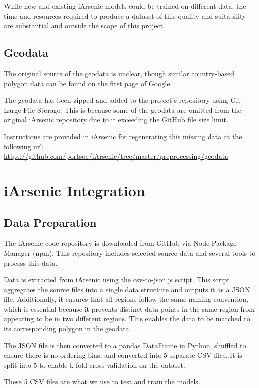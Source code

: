 While new and existing iArsenic models could be trained on different data, the time and resources required to produce a dataset of this quality and suitability are substantial and outside the scope of this project. 

\subsection{Geodata}

The original source of the geodata is unclear, though similar country-based polygon data can be found on the first page of Google.

The geodata has been zipped and added to the project's repository using Git Large File Storage. This is because some of the geodata are omitted from the original iArsenic repository due to it exceeding the GitHub file size limit. 

Instructions are provided in iArsenic for regenerating this missing data at the following url: \url{https://github.com/portsoc/iArsenic/tree/master/preprocessing/geodata}

\section{iArsenic Integration}

\subsection{Data Preparation}
\label{sub: data_prep}

The iArsenic code repository is downloaded from GitHub via Node Package Manager (npm). This repository includes selected source data and several tools to process this data.

Data is extracted from iArsenic using the csv-to-json.js script. This script aggregates the source files into a single data structure and outputs it as a JSON file. Additionally, it ensures that all regions follow the same naming convention, which is essential because it prevents distinct data points in the same region from appearing to be in two different regions. This enables the data to be matched to its corresponding polygon in the geodata.

The JSON file is then converted to a pandas DataFrame in Python, shuffled to ensure there is no ordering bias, and converted into 5 separate CSV files. It is split into 5 to enable k-fold cross-validation on the dataset.

These 5 CSV files are what we use to test and train the models.

